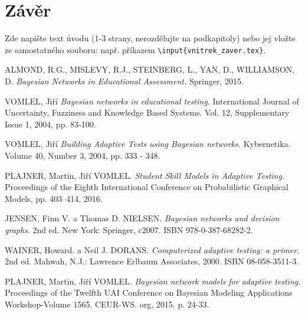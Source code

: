\documentclass[a4paper,twoside,12pt]{scrbook}
\begin{document}

\chapter*{Závěr} %
%
Zde napište text úvodu (1-3 strany, nerozdělujte na podkapitoly) nebo jej vložte ze samostatného souboru: např. příkazem \texttt{\textbackslash input\{vnitrek\_zaver.tex\}}.
%
%


\clearpage  %

\begin{thebibliography}{99}
	 ALMOND, R.G., MISLEVY, R.J., STEINBERG, L., YAN, D., WILLIAMSON, D. \textit{Bayesian Networks in Educational Assessment.} Springer, 2015.

	 VOMLEL, Jiří \textit{Bayesian networks in educational testing.} International Journal of Uncertainty, Fuzziness and Knowledge Based Systems. Vol. 12, Supplementary Issue 1, 2004, pp. 83-100.

	 VOMLEL, Jiří \textit{Building Adaptive Tests using Bayesian networks.} Kybernetika. Volume 40, Number 3, 2004, pp. 333 - 348.

	 PLAJNER, Martin, Jiří VOMLEL. \textit{Student Skill Models in Adaptive Testing.} Proceedings of the Eighth International Conference on Probabilistic Graphical Models, pp. 403–414, 2016.


	 JENSEN, Finn V. a Thomas D. NIELSEN. \textit{Bayesian networks and decision graphs}. 2nd ed. New York: Springer, c2007. ISBN 978-0-387-68282-2.

	 WAINER, Howard. a Neil J. DORANS. \textit{Computerized adaptive testing: a primer}. 2nd ed. Mahwah, N.J.: Lawrence Erlbaum Associates, 2000. ISBN 08-058-3511-3.

	 PLAJNER, Martin, Jiří VOMLEL. \textit{Bayesian network models for adaptive testing.} Proceedings of the Twelfth UAI Conference on Bayesian Modeling Applications Workshop-Volume 1565. CEUR-WS. org, 2015. p. 24-33.


\end{thebibliography}
\end{document}
